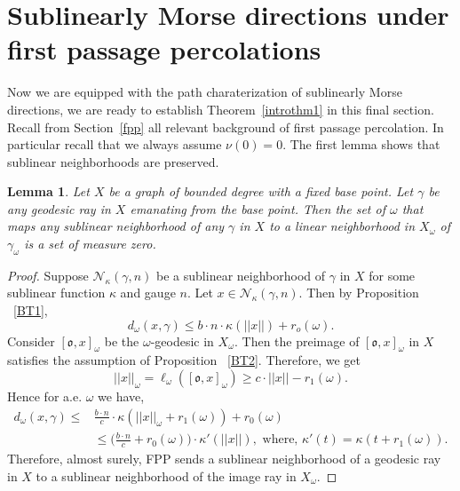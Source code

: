 \documentclass[12 pt]{amsart}
\newcommand{\calN}{\mathcal{N}}
\newcommand{\gothic}{\mathfrak}
\newcommand{\go}{{\gothic o}}
\newtheorem{lemma}[theorem]{Lemma}
\theoremstyle{definition}
\theoremstyle{remark}
\begin{document}
\section{Sublinearly Morse directions under first passage percolations}
Now we are equipped with the path charaterization of sublinearly Morse directions, we are ready to establish Theorem~\ref{introthm1} in this final section. Recall from Section~\ref{fpp} all relevant background of first passage percolation. In particular recall that we always assume $\nu({0})=0$. The first lemma shows that sublinear neighborhoods are preserved.
\begin{lemma}\label{neighborhood}
Let $X$ be a graph of bounded degree with a fixed base point. Let $\gamma$ be any geodesic ray in $X$ emanating from the base point. Then the set of $\omega$ that maps any sublinear neighborhood of any $\gamma$ in $X$ to a linear neighborhood in $X_\omega$ of $\gamma_\omega$ is a set of measure zero.
\end{lemma}
\begin{proof}
Suppose $\calN_\kappa(\gamma,n)$ be a sublinear neighborhood of $\gamma$ in $X$ for some sublinear function $\kappa$ and gauge $n$. Let $x \in \calN_\kappa(\gamma,n)$. Then by Proposition ~\ref{BT1}, \[d_\omega(x, \gamma) \leq b \cdot n \cdot \kappa(||x||) + r_o(\omega).\]
Consider $[\go,x]_\omega$ be the $\omega$-geodesic in $X_\omega$. Then the preimage of  $[\go,x]_\omega$ in $X$ satisfies the assumption of Proposition ~\ref{BT2}. Therefore, we get \[||x||_\omega=\ell_\omega([\go,x]_\omega) \geq c \cdot ||x||-r_1(\omega).\]
Hence for a.e. $\omega$ we have, 
\begin{align*}
d_\omega(x,\gamma) \leq  & \frac{b\cdot n}{c} \cdot \kappa(||x||_\omega+r_1(\omega))+r_0(\omega)\\
& \leq \bigg(\frac{b\cdot n}{c}+r_0(\omega)\bigg) \cdot \kappa'(||x||), \text{ where, $\kappa'(t)= \kappa(t+r_1(\omega))$.}
\end{align*}
Therefore, almost surely, FPP sends a sublinear neighborhood of a geodesic ray in $X$ to a sublinear neighborhood of the image ray in $ X_\omega$.  



\end{proof}
\end{document}
